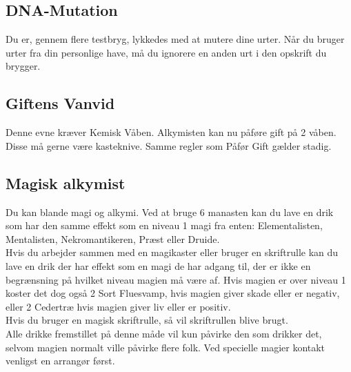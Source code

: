 \subsection{DNA-Mutation}
Du er, gennem flere testbryg, lykkedes med at mutere dine urter. Når du bruger urter fra din personlige have, må du ignorere en anden urt i den opskrift du brygger.\\

\subsection{Giftens Vanvid}
Denne evne kræver Kemisk Våben. Alkymisten kan nu påføre gift på 2 våben. Disse må gerne være kasteknive. Samme regler som Påfør Gift gælder stadig.\\


\subsection{Magisk alkymist}
Du kan blande magi og alkymi. Ved at bruge 6 manasten kan du lave en drik som har den samme effekt som en niveau 1 magi fra enten: Elementalisten, Mentalisten, Nekromantikeren, Præst eller Druide.\\
Hvis du arbejder sammen med en magikaster eller bruger en skriftrulle kan du lave en drik der har effekt som en magi de har adgang til, der er ikke en begrænsning på hvilket niveau magien må være af. Hvis magien er over niveau 1 koster det dog også 2 Sort Fluesvamp, hvis magien giver skade eller er negativ, eller 2 Cedertræ hvis magien giver liv eller er positiv.\\
Hvis du bruger en magisk skriftrulle, så vil skriftrullen blive brugt.\\
Alle drikke fremstillet på denne måde vil kun påvirke den som drikker det, selvom magien normalt ville påvirke flere folk. Ved specielle magier kontakt venligst en arrangør først.\\

